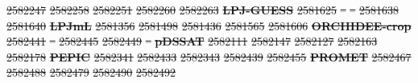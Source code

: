 \documentclass[gmd, manuscript]{copernicus} %
\providecommand{\DIFdel}[1]{{\protect\color{red}\sout{#1}}}                      %
\providecommand{\DIFdelFL}[1]{\DIFdel{#1}} %
\begin{document}
\DIFdelFL{2582247}%
\DIFdelFL{2582258}%
\DIFdelFL{2582251}%
\DIFdelFL{2582260}%
\DIFdelFL{2582263}%
\textbf{\DIFdelFL{LPJ-GUESS}}%
\DIFdelFL{2581625}%
\DIFdelFL{--}%
\DIFdelFL{--}%
\DIFdelFL{2581638}%
\DIFdelFL{2581640}%
\textbf{\DIFdelFL{LPJmL}}%
\DIFdelFL{2581356}%
\DIFdelFL{2581498}%
\DIFdelFL{2581436}%
\DIFdelFL{2581565}%
\DIFdelFL{2581606}%
\textbf{\DIFdelFL{ORCHIDEE-crop}}%
\DIFdelFL{2582441}%
\DIFdelFL{--}%
\DIFdelFL{2582445}%
\DIFdelFL{2582449}%
\DIFdelFL{--}%
\textbf{\DIFdelFL{pDSSAT}}%
\DIFdelFL{2582111}%
\DIFdelFL{2582147}%
\DIFdelFL{2582127}%
\DIFdelFL{2582163}%
\DIFdelFL{2582178}%
\textbf{\DIFdelFL{PEPIC}}%
\DIFdelFL{2582341}%
\DIFdelFL{2582433}%
\DIFdelFL{2582343}%
\DIFdelFL{2582439}%
\DIFdelFL{2582455}%
\textbf{\DIFdelFL{PROMET}}%
\DIFdelFL{2582467}%
\DIFdelFL{2582488}%
\DIFdelFL{2582479}%
\DIFdelFL{2582490}%
\DIFdelFL{2582492}%

\end{document}

